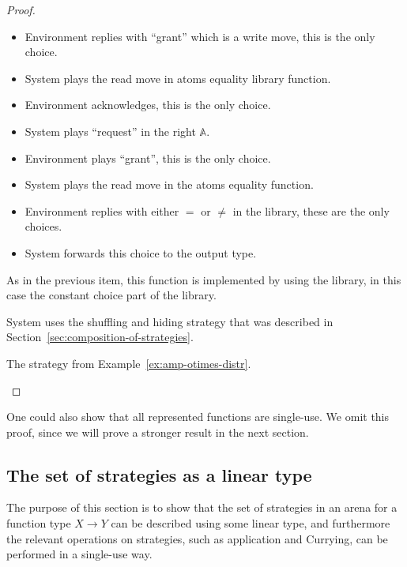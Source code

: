 \documentclass[10pt,a4paper]{amsart}
\numberwithin{equation}{section}
\theoremstyle{plain}
\newcommand{\atoms}{\mathbb A}
\begin{document}
\begin{proof}
\begin{description}
\begin{itemize}
    \item Environment replies with ``grant'' which is a write move, this is the only choice.
    \item System plays the read move in atoms equality library function.
    \item Environment acknowledges, this is the only choice.
    \item System plays  ``request'' in the right $\atoms$.
    \item Environment plays ``grant'', this is the only choice.
    \item System plays the read move in the atoms equality function.
    \item Environment replies with either $=$ or $\neq$ in the library, these are the only choices.
    \item System forwards this choice to the output type.
\end{itemize}
        

        \item[Constant function of type $1 \to \atoms$] As in the previous item, this function is implemented by using the library, in this case the constant choice part of the library. 

        \item[Projection of type $ X \otimes Y \to X$] System uses the  shuffling and hiding strategy that was described in Section~\ref{sec:composition-of-strategies}. 

        \item[Distributivity  of type $X \otimes (Y \& Z) \to (X \otimes Y) \& (X \otimes Z)$] The  strategy from Example~\ref{ex:amp-otimes-distr}.  
    \end{description}
\end{proof}
One could also show that all represented functions are single-use. We omit this proof, since we will prove a stronger result in the next section. 

\subsection{The set of strategies as a linear type}
The purpose of this section is to show that the set of strategies in an arena for a function type $X \to Y$ can be described using some linear type, and furthermore the relevant operations on strategies, such as application and Currying, can be performed in a single-use way.
\end{document}
